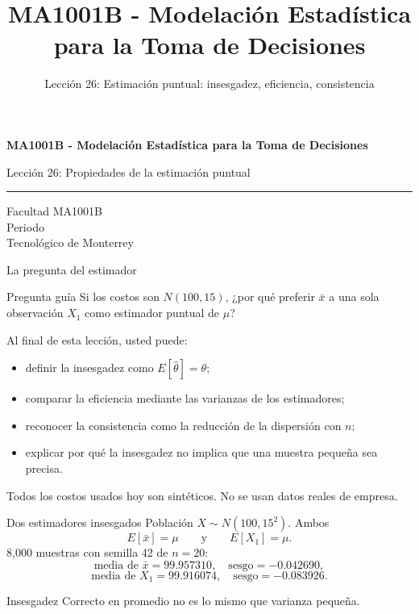 \documentclass[aspectratio=169,10pt,spanish]{beamer}
\title{MA1001B - Modelación Estadística para la Toma de Decisiones}
\subtitle{Lección 26: Estimación puntual: insesgadez, eficiencia, consistencia}
\author{}
\institute{Tecnol\'ogico de Monterrey}
\date{}
\begin{document}
\begin{frame}[plain]
  \vspace{1.2cm}
  {\Large\bfseries MA1001B - Modelación Estadística para la Toma de Decisiones\par}
  \vspace{0.7cm}
  {\large Lección 26: Propiedades de la estimación puntual\par}
  \vspace{0.7cm}
  {\color{TecRojo}\rule{\textwidth}{1.2pt}}
  \vspace{0.8cm}

  Facultad MA1001B\\[0.3cm]
  Periodo\\[0.3cm]
  Tecnol\'ogico de Monterrey
\end{frame}

\begin{frame}{La pregunta del estimador}
  \begin{alertblock}{Pregunta guía}
    Si los costos son $N(100,15)$, ¿por qué preferir $\bar x$ a una sola
    observación $X_1$ como estimador puntual de $\mu$?
  \end{alertblock}

  \vspace{0.6em}
  Al final de esta lección, usted puede:
  \begin{itemize}
    \item definir la insesgadez como $E[\hat\theta]=\theta$;
    \item comparar la eficiencia mediante las varianzas de los estimadores;
    \item reconocer la consistencia como la reducción de la dispersión con $n$;
    \item explicar por qué la insesgadez no implica que una muestra pequeña sea precisa.
  \end{itemize}

  \vfill
  \scriptsize Todos los costos usados hoy son sintéticos. No se usan datos reales de empresa.
\end{frame}

\begin{frame}{Dos estimadores insesgados}
  \small
  Población $X\sim N(100,15^2)$. Ambos
  \[
    E[\bar x]=\mu\qquad\text{y}\qquad E[X_1]=\mu.
  \]
  8{,}000 muestras con semilla 42 de $n=20$:
  \[
    \text{media de }\bar x=99.957310,\quad \text{sesgo}=-0.042690,
  \]
  \[
    \text{media de }X_1=99.916074,\quad \text{sesgo}=-0.083926.
  \]

  \vspace{0.3em}
  \begin{exampleblock}{Insesgadez}
    Correcto en promedio no es lo mismo que varianza pequeña.
  \end{exampleblock}
\end{frame}
\end{document}
